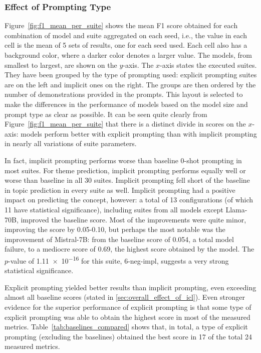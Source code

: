 \documentclass[english, 12pt, a4paper, sci, utf8, a-2b, online]{latex/definitions/aaltothesis}
\begin{document}
\subsubsection{Effect of Prompting Type} \label{sec:implicit_explicit_compared} %

Figure~\ref{fig:f1_mean_per_suite} shows the mean F1 score obtained for each combination of model and suite aggregated on each seed, i.e., the value in each cell is the mean of 5 sets of results, one for each seed used. Each cell also has a background color, where a darker color denotes a larger value. The models, from smallest to largest, are shown on the $y$-axis. The $x$-axis states the  executed suites. They have been grouped by the type of prompting used: explicit prompting suites are on the left and implicit ones on the right. The groups are then ordered by the number of demonstrations provided in the prompts. This layout is selected to make the differences in the performance of models based on the model size and prompt type as clear as possible. It can be seen quite clearly from Figure~\ref{fig:f1_mean_per_suite} that there is a distinct divide in scores on the $x$-axis: models perform better with explicit prompting than with implicit prompting in nearly all variations of suite parameters.

In fact, implicit prompting performs worse than baseline 0-shot prompting in most suites. For theme prediction, implicit prompting performs equally well or worse than baseline in all 30 suites. Implicit prompting fell short of the baseline in topic prediction in every suite as well. Implicit prompting had a positive impact on predicting the concept, however: a total of 13 configurations (of which 11 have statistical significance), including suites from all models except Llama-70B, improved the baseline score. Most of the improvements were quite minor, improving the score by 0.05-0.10, but perhaps the most notable was the improvement of Mistral-7B: from the baseline score of 0.054, a total model failure, to a mediocre score of 0.69, the highest score obtained by the model. The $p$-value of \num{1.11e-16} for this suite, 6-neg-impl, suggests a very strong statistical significance.

Explicit prompting yielded better results than implicit prompting, even exceeding almost all baseline scores (stated in \ref{sec:overall_effect_of_icl}). Even stronger evidence for the superior performance of explicit prompting is that some type of explicit prompting was able to obtain the highest score in most of the measured metrics. Table~\ref{tab:baselines_compared} shows that, in total, a type of explicit prompting (excluding the baselines) obtained the best score in 17 of the total 24 measured metrics.
\end{document}
